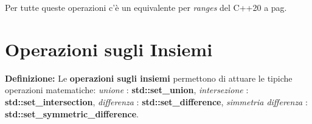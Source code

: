 \fleuron

\textsf{\small Per tutte queste operazioni c'è un equivalente per \emph{ranges} del C++20 a pag. \pageref{ranges_merge}} \\


\newpage

\section{Operazioni sugli Insiemi}

\textsf{\small \textbf{Definizione: } Le \textbf{operazioni sugli insiemi} permettono di attuare le tipiche operazioni matematiche: \emph{unione} : \textbf{std::set\_union}, \emph{intersezione} : \textbf{std::set\_intersection}, \emph{differenza} : \textbf{std::set\_difference}, \emph{simmetria differenza} : \textbf{std::set\_symmetric\_difference}.} \\

